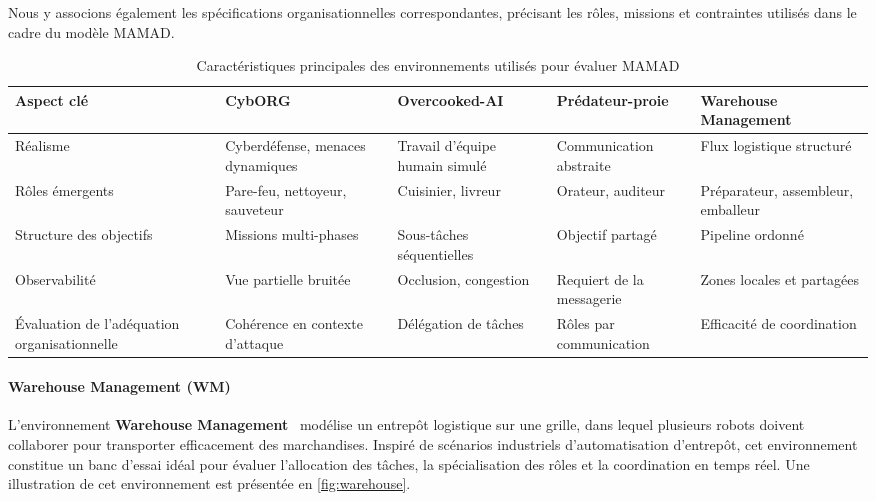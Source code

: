 Nous y associons également les spécifications organisationnelles correspondantes, précisant les rôles, missions et contraintes utilisés dans le cadre du modèle MAMAD.

\vspace{0.5em}
\begin{table}[h!]
    \centering
    \begin{footnotesize}
        \renewcommand{\arraystretch}{1.3}
        \begin{tabular}{p{2.5cm}p{2.2cm}p{2.2cm}p{2.2cm}p{2.2cm}}
            \hline
            \textbf{Aspect clé}            & \textbf{CybORG}               & \textbf{Overcooked-AI} & \textbf{Prédateur-proie} & \textbf{Warehouse Management} \\ \hline
            Réalisme                       & Cyberdéfense, menaces dynamiques & Travail d'équipe humain simulé & Communication abstraite     & Flux logistique structuré \\ \hline
            Rôles émergents                & Pare-feu, nettoyeur, sauveteur & Cuisinier, livreur     & Orateur, auditeur          & Préparateur, assembleur, emballeur \\ \hline
            Structure des objectifs        & Missions multi-phases         & Sous-tâches séquentielles & Objectif partagé         & Pipeline ordonné \\ \hline
            Observabilité                  & Vue partielle bruitée         & Occlusion, congestion   & Requiert de la messagerie & Zones locales et partagées \\ \hline
            Évaluation de l'adéquation organisationnelle & Cohérence en contexte d'attaque & Délégation de tâches   & Rôles par communication   & Efficacité de coordination \\ \hline
        \end{tabular}
        \caption{Caractéristiques principales des environnements utilisés pour évaluer MAMAD}
        \label{tab:mamad_env_characteristics}
    \end{footnotesize}
\end{table}


\paragraph{Warehouse Management (WM)}

L'environnement \textbf{Warehouse Management}~\cite{warehouse_management} modélise un entrepôt logistique sur une grille, dans lequel plusieurs robots doivent collaborer pour transporter efficacement des marchandises. Inspiré de scénarios industriels d'automatisation d'entrepôt, cet environnement constitue un banc d'essai idéal pour évaluer l'allocation des tâches, la spécialisation des rôles et la coordination en temps réel. Une illustration de cet environnement est présentée en \autoref{fig:warehouse}.


